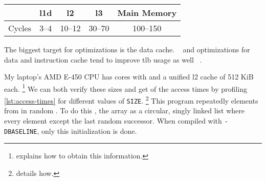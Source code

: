 \begin{center}
   \begin{tabular}{ r | c c c c }
             & \gls{l1d} & \gls{l2} & \gls{l3} & Main Memory \\ \hline
      Cycles & 3--4      & 10--12   & 30--70   & 100--150
   \end{tabular}
\end{center}
%

The biggest target for optimizations is the data cache.  ~\cite[31]{drepper2007} and optimizations for data and instruction cache
tend to improve \gls{tlb} usage as well%
~\cite[\href{https://youtu.be/WDIkqP4JbkE?t=11m53s}{11:53}]{scott-meyers-talk}.

My laptop's AMD E-450 CPU has cores with  and a unified \gls{l2} cache of 512 KiB each.%
\footnote{ explains how to obtain this information.}
We can both verify these sizes and get  of the access times by profiling
\cref{lst:access-times}
for different values of \texttt{SIZE}.%
\footnote{ details how.}
This program repeatedly  elements
from 
in random .
To do this
, the array  as a
circular, singly linked list where every element except the last 
random successor.  When compiled with \texttt{-DBASELINE}, only this
initialization is done.

%
\begin{comment}
   \begin{figure}
      \inputminted[firstline=9]{c}{access-times/access-times.c}
      \captionof{listing}{TODO}
      \label{lst:access-times}
   \end{figure}
\end{comment}

